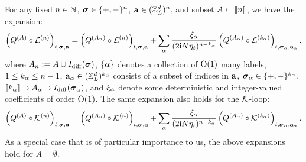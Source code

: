 \begin{lemma}\label{lem: newPQ}
For any fixed $n\in \mathbb{N}$, ${\boldsymbol{\sigma}}\in \{+,-\}^n$, ${\mathbf{a}}\in({\mathbb Z}_L^d)^n$, and subset $A\subset\llbracket{n}\rrbracket$, we have the expansion: 
\begin{align}\label{yurenAL}
\left(Q^{(A)}\circ {\mathcal L}^{(n)}\right)_{t,{\boldsymbol{\sigma}},{\mathbf{a}}}=\left(Q^{(A_n)}\circ {\mathcal L}^{(n)}\right)_{t,{\boldsymbol{\sigma}},{\mathbf{a}}}+\sum_\alpha \frac{\xi_{\alpha}}{(2\mathrm{i} N\eta_t)^{n-k_\alpha}} \left( Q^{(A_\alpha)}\circ {\mathcal L}^{(k_\alpha)}\right)_{t,{\boldsymbol{\sigma}}_{\alpha},{\mathbf{a}}_{\alpha}},
 \end{align}
where $A_n:=A\cup I_{\mathrm{diff}}({\boldsymbol{\sigma}})$, $\{\alpha\}$ denotes a collection of $\operatorname{O}(1)$ many labels, $1\le k_\alpha \le n-1$, ${\mathbf{a}}_{\alpha}\in ({\mathbb Z}_L^d)^{k_\alpha}$ consists of a subset of indices in ${\mathbf{a}}$, ${\boldsymbol{\sigma}}_\alpha\in \{+,-\}^{k_\alpha}$, $\llbracket{k_\alpha}\rrbracket\supset A_\alpha \supset I_{\mathrm{diff}}({\boldsymbol{\sigma}}_\alpha)$, and $\xi_{\alpha}$ denote some deterministic and integer-valued coefficients of order $\operatorname{O}(1)$. The same expansion also holds for the $\mathcal K$-loop:
\begin{align}\label{yurenAK}
\left(Q^{(A)}\circ {\mathcal K}^{(n)}\right)_{t,{\boldsymbol{\sigma}},{\mathbf{a}}}=\left(Q^{(A_n)}\circ {\mathcal K}^{(n)}\right)_{t,{\boldsymbol{\sigma}},{\mathbf{a}}}+ \sum_\alpha \frac{\xi_{\alpha}}{(2\mathrm{i} N\eta_t)^{n-k_\alpha}} \left( Q^{(A_\alpha )}\circ {\mathcal K}^{(k_\alpha)}\right)_{t,{\boldsymbol{\sigma}}_\alpha,{\mathbf{a}}_\alpha }.
 \end{align}
As a special case that is of particular importance to us, the above expansions hold for $A=\emptyset$. 
    \end{lemma}



 


